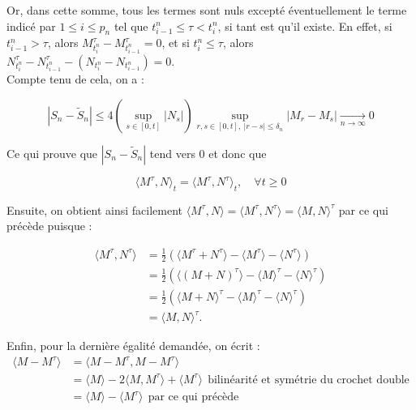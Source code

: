 \documentclass[a4paper,12pt]{article}
\begin{document}
Or, dans cette somme, tous les termes sont nuls excepté éventuellement le terme indicé par $1 \leq i \leq p_n$ tel que $t_{i-1}^n \leq \tau < t_i^n$, si tant est qu'il existe. En effet, si $t_{i-1}^n > \tau$, alors $M^{\tau}_{t_i^n} - M^{\tau}_{t_{i-1}^n} = 0$, et si $t_i^n \leq \tau$, alors $N^\tau_{t_i^n} - N^\tau_{t_{i-1}^n} - (N_{t_i^n} - N_{t_{i-1}^n}) = 0$. \\

Compte tenu de cela, on a :

$$|S_n - \tilde{S}_n| \leq 4 \left( \sup_{s \in [0,t]} |N_s| \right) \sup_{r, s \in [0,t], \ |r-s| \leq \delta_n} |M_r - M_s| \xrightarrow[n \to \infty]{} 0$$

Ce qui prouve que $|S_n - \tilde{S}_n|$ tend vers $0$ et donc que 

$$\langle M^{\tau}, N \rangle_t = \langle M^{\tau}, N^{\tau} \rangle_t, \quad \forall t \geq 0$$

Ensuite, on obtient ainsi facilement $\langle M^{\tau}, N \rangle = \langle M^{\tau}, N^{\tau} \rangle = \langle M,N \rangle^{\tau}$ par ce qui précède puisque :

\begin{align*}
\langle M^{\tau}, N^{\tau} \rangle &= \frac{1}{2} (\langle M^{\tau} + N^{\tau} \rangle - \langle M^{\tau} \rangle - \langle N^{\tau} \rangle) \\
&= \frac{1}{2} (\langle (M+N)^{\tau} \rangle - \langle M \rangle^{\tau} - \langle N \rangle^{\tau}) \\
&= \frac{1}{2} (\langle M+N \rangle^{\tau} - \langle M \rangle^{\tau} - \langle N \rangle^{\tau}) \\
&= \langle M,N \rangle^{\tau}.
\end{align*}


Enfin, pour la dernière égalité demandée, on écrit :
\begin{align*}
\langle M - M^{\tau} \rangle & =  \langle M - M^{\tau} , M - M^{\tau} \rangle \\
& = \langle M \rangle - 2 \langle M, M^\tau \rangle + \langle M^{\tau} \rangle \ \ \text{bilinéarité et symétrie du crochet double} \\
& = \langle M \rangle - \langle M^\tau \rangle \ \ \text{par ce qui précède}
\end{align*}
\end{document}
